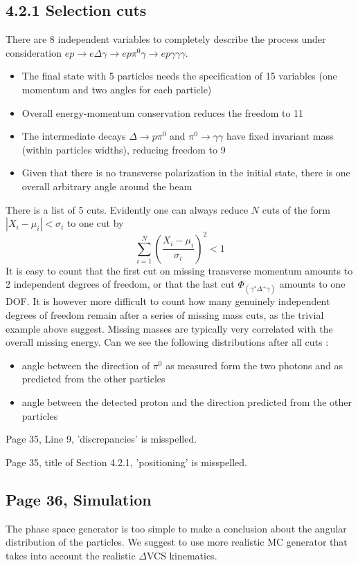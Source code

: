 \documentclass[11pt]{paper}
\begin{document}
\subsection*{4.2.1 Selection cuts}
There are 8 independent variables to completely describe the process under consideration $ep\rightarrow e\Delta\gamma\rightarrow ep\pi^0\gamma\rightarrow ep\gamma\gamma\gamma$.
\begin{itemize}
\item The final state with 5 particles needs the specification of 15 variables (one momentum and two angles for each particle)
\item Overall energy-momentum conservation reduces the freedom to 11
\item The intermediate decays $\Delta\rightarrow p\pi^0$ and $\pi^0\rightarrow\gamma\gamma$ have fixed invariant mass (within particles widths), reducing freedom to 9
\item Given that there is no transverse polarization in the initial state, there is one overall arbitrary angle around the beam
\end{itemize}
There is a list of 5 cuts. Evidently one can always reduce $N$ cuts of the form $|X_i-\mu_i|<\sigma_i$ to one cut by 
$$\sum_{i=1}^N\left(\frac{X_i-\mu_i}{\sigma_i}\right)^2<1$$
It is easy to count that the first cut on missing transverse momentum amounts to 2 independent degrees of freedom, or that the last cut $\Phi_{(\gamma^*\Delta^+\gamma)}$ amounts to one DOF.
It is however more difficult to count how many genuinely independent degrees of freedom remain after a series of missing mass cuts, as the trivial example above suggest.
Missing masses are typically very correlated with the overall missing energy.
Can we see the following distributions after all cuts :
\begin{itemize}
\item angle between the direction of $\pi^0$ as measured form the two photons and as predicted from the other particles
\item angle between the detected proton and the direction predicted from the other particles
\end{itemize}

Page 35, Line 9, 'discrepancies' is misspelled.

Page 35, title of Section 4.2.1, 'positioning' is misspelled.

\subsection*{Page 36, Simulation} The phase space generator is too simple to make a conclusion about the angular distribution of the particles. 
We suggest to use more realistic MC generator that takes into account the realistic $\Delta$VCS kinematics.
\end{document}
